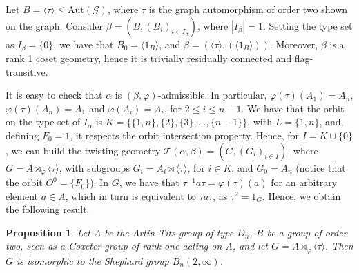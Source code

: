 \documentclass[11pt,letterpaper]{amsart}
\newtheorem{prop}{Proposition}[section]
\newcommand{\GG}{\mathcal{G}}
\newcommand{\TT}{\mathcal{T}}
\newcommand{\Aut}{\mathrm{Aut}}
\begin{document}
Let $B=\langle \tau \rangle\leq \Aut(\GG)$, where $\tau$ is the graph automorphism of order two shown on the graph.
Consider $\beta=(B,(B_i)_{i\in I_\beta})$, where $|I_\beta|=1$. Setting the type set as $I_\beta=\{0\}$, we have that $B_0=\langle 1_B\rangle$, and $\beta= (\langle\tau\rangle,(\langle 1_B\rangle))$. Moreover, $\beta$ is a rank 1 coset geometry, hence it is trivially residually connected and flag-transitive. 

It is easy to check that $\alpha$ is $(\beta,\varphi)$-admissible. In particular, $\varphi(\tau)(A_1)=A_n$, $\varphi(\tau)(A_n)=A_1$ and $\varphi(A_i)=A_i$, for $2\leq i\leq n-1$. We have that the orbit on the type set of $I_\alpha$ is $K=\{\{1,n\},\{2\},\{3\},\ldots,\{n-1\}\}$, with $L=\{1,n\}$, and, defining $F_0=1$, it respects the orbit intersection property.
Hence, for $I=K\cup\{0\}$, we can build the twisting geometry $\TT(\alpha,\beta)=(G,(G_i)_{i\in I})$, where $G=A\rtimes_\varphi \langle \tau\rangle$, with subgroups $G_i= A_i\rtimes \langle \tau \rangle $, for $i\in K$, and $G_0 = A_n$ (notice that the orbit $O^0 = \{F_0\}$).
In $G$, we have that $\tau^{-1}a\tau=\varphi(\tau)(a)$ for an arbitrary element $a\in A$, which in turn is equivalent to $\tau a\tau$, as $\tau^2=1_G$.
Hence, we obtain the following result.
\begin{prop}\label{prop:Artin_to_MikadoBraid}
    Let $A$ be the Artin-Tits group of type $D_n$, $B$ be a group of order two, seen as a Coxeter group of rank one acting on $A$, and let $G=A\rtimes_\varphi \langle \tau\rangle$. Then $G$ is isomorphic to the Shephard group $B_n(2,\infty)$.
\end{prop}
\end{document}
